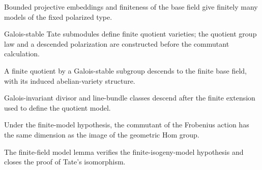 \begin{lemma}
\label{mumford-app1-finite-field-finiteness-lemma}
Bounded projective embeddings and finiteness of the base field give finitely many
models of the fixed polarized type.
\notready
\end{lemma}

\begin{remark}
\label{mumford-app1-step-descent-torsion-quotients}
Galois-stable Tate submodules define finite quotient varieties; the quotient
group law and a descended polarization are constructed before the commutant
calculation.
\notready
\end{remark}

\begin{lemma}
\label{mumford-app1-quotient-descent-lemma}
A finite quotient by a Galois-stable subgroup descends to the finite base field,
with its induced abelian-variety structure.
\notready
\end{lemma}

\begin{lemma}
\label{mumford-app1-line-bundle-galois-descent-lemmas}
Galois-invariant divisor and line-bundle classes descend after the finite
extension used to define the quotient model.
\notready
\end{lemma}

\begin{remark}
\label{mumford-app1-step-commutant-isomorphism}
Under the finite-model hypothesis, the commutant of the Frobenius action has
the same dimension as the image of the geometric Hom group.
\notready
\end{remark}

\begin{remark}
\label{mumford-app1-step-verification-finite-field}
The finite-field model lemma verifies the finite-isogeny-model hypothesis and
closes the proof of Tate's isomorphism.
\notready
\end{remark}

